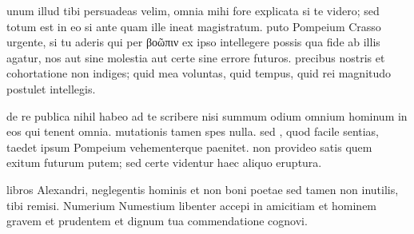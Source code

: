  unum illud tibi persuadeas velim, omnia mihi fore explicata si te videro; sed totum est in eo si ante quam ille ineat magistratum. puto Pompeium Crasso urgente, si tu aderis qui per βοῶπιν ex ipso intellegere possis qua fide ab illis agatur, nos aut sine molestia aut certe sine errore futuros. precibus nostris et cohortatione non indiges; quid mea voluntas, quid tempus, quid rei magnitudo postulet intellegis.

 de re publica nihil habeo ad te scribere nisi summum odium omnium hominum in eos qui tenent omnia. mutationis tamen spes nulla. sed , quod facile sentias, taedet ipsum Pompeium vehementerque paenitet. non provideo satis quem exitum futurum putem; sed certe videntur haec aliquo eruptura.

 libros Alexandri, neglegentis hominis et non boni poetae sed tamen non inutilis, tibi remisi. Numerium Numestium libenter accepi in amicitiam et hominem gravem et prudentem et dignum tua commendatione cognovi.
